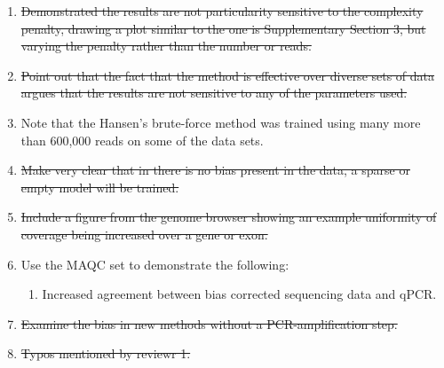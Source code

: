 \documentclass{article}
\begin{document}

\begin{enumerate}

\item \sout{Demonstrated the results are not particularity sensitive to the
complexity penalty, drawing a plot similar to the one is Supplementary Section
3, but varying the penalty rather than the number or reads.}

\item \sout{Point out that the fact that the method is effective over diverse sets of
data argues that the results are not sensitive to any of the parameters used.}

\item Note that the Hansen's brute-force method was trained using many more than
600,000 reads on some of the data sets.


\item \sout{Make very clear that in there is no bias present in the data, a sparse or
empty model will be trained.}

\item \sout{Include a figure from the genome browser showing an example uniformity of
coverage being increased over a gene or exon.}

\item Use the MAQC set to demonstrate the following:
\begin{enumerate}
\item Increased agreement between bias corrected sequencing data and qPCR.
\end{enumerate}

\item \sout{Examine the bias in new methods without a PCR-amplification step.}

\item \sout{Typos mentioned by reviewr 1.}


\end{enumerate}
\end{document}
